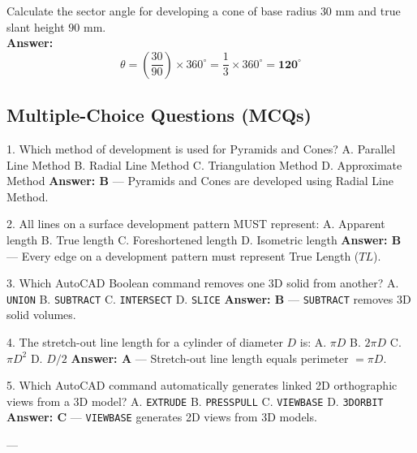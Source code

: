 \begin{vivaqa}
Calculate the sector angle for developing a cone of base radius $30\text{ mm}$ and true slant height $90\text{ mm}$.\\[4pt]
\textbf{Answer:}  
$$\theta = \left( \frac{30}{90} \right) \times 360^\circ = \frac{1}{3} \times 360^\circ = \mathbf{120^\circ}$$
\end{vivaqa}

\subsection{Multiple-Choice Questions (MCQs)}

1. Which method of development is used for Pyramids and Cones?  
   A. Parallel Line Method  
   B. Radial Line Method  
   C. Triangulation Method  
   D. Approximate Method  
   \textbf{Answer: B} — Pyramids and Cones are developed using Radial Line Method.

2. All lines on a surface development pattern MUST represent:  
   A. Apparent length  
   B. True length  
   C. Foreshortened length  
   D. Isometric length  
   \textbf{Answer: B} — Every edge on a development pattern must represent True Length ($TL$).

3. Which AutoCAD Boolean command removes one 3D solid from another?  
   A. \texttt{UNION}  
   B. \texttt{SUBTRACT}  
   C. \texttt{INTERSECT}  
   D. \texttt{SLICE}  
   \textbf{Answer: B} — \texttt{SUBTRACT} removes 3D solid volumes.

4. The stretch-out line length for a cylinder of diameter $D$ is:  
   A. $\pi D$  
   B. $2\pi D$  
   C. $\pi D^2$  
   D. $D/2$  
   \textbf{Answer: A} — Stretch-out line length equals perimeter $= \pi D$.

5. Which AutoCAD command automatically generates linked 2D orthographic views from a 3D model?  
   A. \texttt{EXTRUDE}  
   B. \texttt{PRESSPULL}  
   C. \texttt{VIEWBASE}  
   D. \texttt{3DORBIT}  
   \textbf{Answer: C} — \texttt{VIEWBASE} generates 2D views from 3D models.

---

